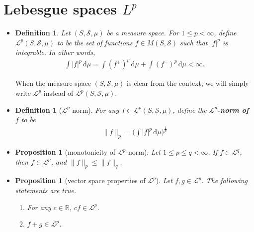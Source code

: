\documentclass[10pt]{article}
\newtheorem{definition}[lemma]{Definition}
\newtheorem{proposition}[lemma]{Proposition}
\numberwithin{lemma}{section}
\newcommand{\dee}{\mathrm{d}}
\newcommand{\mcal}[1]{\mathcal{#1}}
\newcommand{\Real}{\mathbb{R}}
\begin{document}
\section{Lebesgue spaces $L^p$}

\begin{itemize}
  \item \begin{definition}
    Let $(S, \mcal{S}, \mu)$ be a measure space. For $1 \leq p < \infty$, define $\mcal{L}^p(S,\mcal{S}, \mu)$ to be the set of functions $f \in M(S,\mcal{S})$ such that $|f|^p$ is integrable. In other words,
    \begin{align*}
      \int |f|^p\, \dee\mu = \int (f^+)^p\, \dee\mu + \int (f^-)^p\, \dee\mu < \infty.
    \end{align*}
  \end{definition}
  When the measure space $(S, \mcal{S}, \mu)$ is clear from the context, we will simply write $\mcal{L}^p$ instead of $\mcal{L}^p(S,\mcal{S}, \mu)$.

  \item \begin{definition}[$\mcal{L}^p$-norm]
    For any $f \in \mcal{L}^p(S,\mcal{S},\mu)$, define the {\bf $\mcal{L}^p$-norm of $f$} to be
    \begin{align*}
      \| f \|_p = \bigg( \int |f|^p\, \dee\mu \bigg)^{\frac{1}{p}}
    \end{align*} 
  \end{definition}

  \item \begin{proposition}[monotonicity of $\mcal{L}^p$-norm] \label{thm:Lp-norm-monotonicity}
    Let $1 \leq p \leq q < \infty$. If $f \in \mcal{L}^q$, then $f \in \mcal{L}^p$, and $\| f \|_p \leq \| f \|_q$.
  \end{proposition}

  \item \begin{proposition}[vector space properties of $\mcal{L}^p$]
    Let $f, g \in \mcal{L}^p$. The following statements are true.
    \begin{enumerate}
      \item For any $c \in \Real$, $cf \in \mcal{L}^p$.
      \item $f + g \in \mcal{L}^p$.
    \end{enumerate}
  \end{proposition}


\end{itemize}
\end{document}
